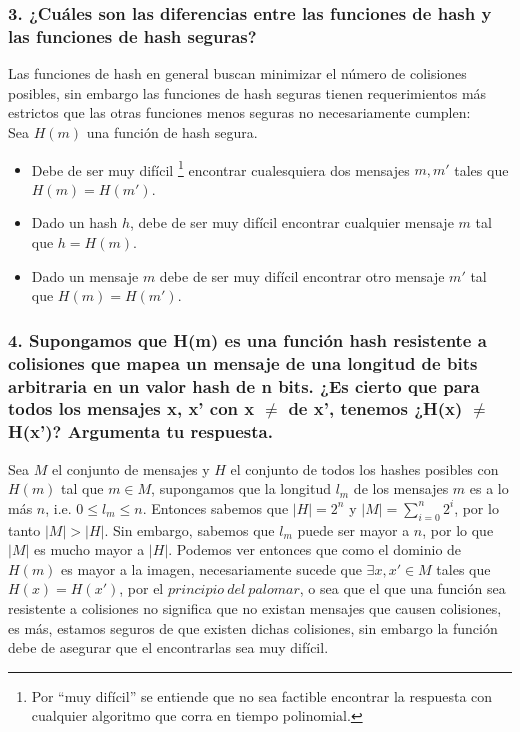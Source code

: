 \documentclass[12pt]{article}
\begin{document}
\subsubsection*{3. ¿Cuáles son las diferencias entre las funciones de hash y las funciones de hash seguras?}
Las funciones de hash en general buscan minimizar el número de colisiones posibles, sin embargo las funciones de hash seguras tienen requerimientos más estrictos que las otras funciones menos seguras no necesariamente cumplen: \\
Sea $H(m)$ una función de hash segura.
\begin{itemize}
\item Debe de ser muy difícil \footnote{Por ``muy difícil'' se entiende que no sea factible encontrar la respuesta con cualquier algoritmo que corra en tiempo polinomial.} encontrar cualesquiera dos mensajes $m, m'$ tales que $H(m) = H(m')$.
\item Dado un hash $h$, debe de ser muy difícil encontrar cualquier mensaje $m$ tal que $h = H(m)$.
\item Dado un mensaje $m$ debe de ser muy difícil encontrar otro mensaje $m'$ tal que $H(m) = H(m')$.
\end{itemize}

\subsubsection*{4. Supongamos que H(m) es una función hash resistente a colisiones que mapea un mensaje de una longitud de bits arbitraria en un valor hash de n bits. ¿Es cierto que para todos los mensajes x, x’ con x $\neq$ de x’, tenemos ¿H(x) $\neq$ H(x')? Argumenta tu respuesta.}
Sea $M$ el conjunto de mensajes y $H$ el conjunto de todos los hashes posibles con $H(m)$ tal que $m \in M$, supongamos que la longitud $l_m$ de los mensajes $m$ es a lo más $n$, i.e. $0 \leq l_m \leq n$. Entonces sabemos que $|H| = 2^n$ y $|M| = \sum_{i = 0}^n 2^i$, por lo tanto $|M| > |H|$. Sin embargo, sabemos que $l_m$ puede ser mayor a $n$, por lo que $|M|$ es mucho mayor a $|H|$. Podemos ver entonces que como el dominio de $H(m)$ es mayor a la imagen, necesariamente sucede que $\exists x, x' \in M$ tales que $H(x) = H(x')$, por el $principio\ del\ palomar$, o sea que el que una función sea resistente a colisiones no significa que no existan mensajes que causen colisiones, es más, estamos seguros de que existen dichas colisiones, sin embargo la función debe de asegurar que el encontrarlas sea muy difícil.
\end{document}
